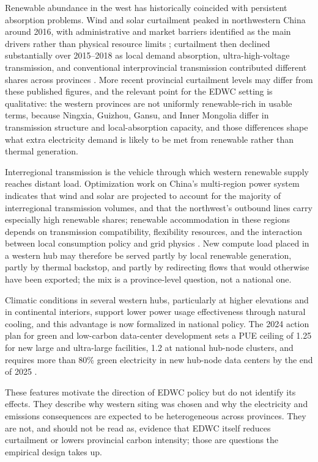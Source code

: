 \documentclass[12pt,a4paper]{article}
\begin{document}
Renewable abundance in the west has historically coincided with
persistent absorption problems. Wind and solar curtailment peaked in
northwestern China around 2016, with administrative and market
barriers identified as the main drivers rather than physical resource
limits \citep{liuetal-2018-curtailmentrenewableenergy}; curtailment
then declined substantially over 2015--2018 as local demand
absorption, ultra-high-voltage transmission, and conventional
interprovincial transmission contributed different shares across
provinces \citep{zhangetal-2021-whatdrivingremarkable}. More recent
provincial curtailment levels may differ from these published
figures, and the relevant point for the EDWC setting is qualitative:
the western provinces are not uniformly renewable-rich in usable
terms, because Ningxia, Guizhou, Gansu, and Inner Mongolia differ in
transmission structure and local-absorption capacity, and those
differences shape what extra electricity demand is likely to be met
from renewable rather than thermal generation.

Interregional transmission is the vehicle through which western
renewable supply reaches distant load. Optimization work on China's
multi-region power system indicates that wind and solar are projected
to account for the majority of interregional transmission volumes, and
that the northwest's outbound lines carry especially high renewable
shares; renewable accommodation in these regions depends on
transmission compatibility, flexibility resources, and the interaction
between local consumption policy and grid physics
\citep{dengetal-2022-assessingintegrationeffect}. New compute load
placed in a western hub may therefore be served partly by local
renewable generation, partly by thermal backstop, and partly by
redirecting flows that would otherwise have been exported; the mix is
a province-level question, not a national one.

Climatic conditions in several western hubs, particularly at higher
elevations and in continental interiors, support lower power usage
effectiveness through natural cooling, and this advantage is now
formalized in national policy. The 2024 action plan for green and
low-carbon data-center development sets a PUE ceiling of 1.25 for new
large and ultra-large facilities, 1.2 at national hub-node clusters,
and requires more than 80\% green electricity in new hub-node data
centers by the end of 2025
\citep{nationaldevelopmentandreformcommissionetal-2024-shujuzhongxinluseditanfazhanzhuanxiangxingdongjihua}.

These features motivate the direction of EDWC policy but do not
identify its effects. They describe why western siting was chosen and
why the electricity and emissions consequences are expected to be
heterogeneous across provinces. They are not, and should not be read
as, evidence that EDWC itself reduces curtailment or lowers provincial
carbon intensity; those are questions the empirical design takes up.
\end{document}
